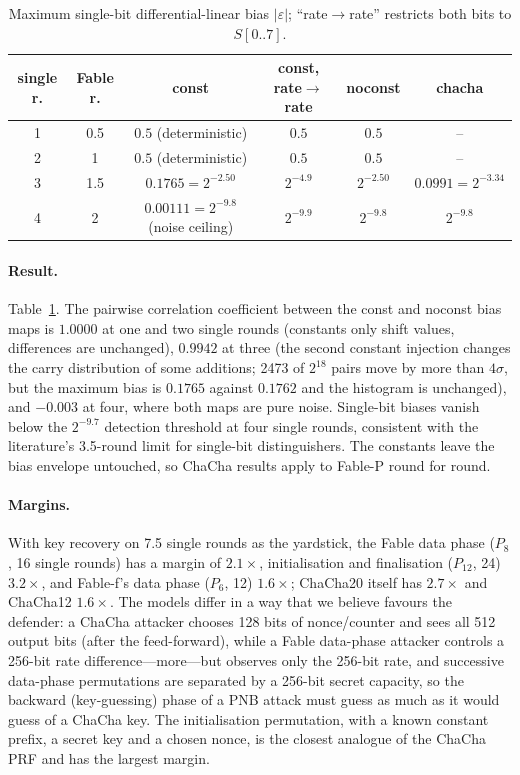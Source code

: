 \documentclass{iacrtrans}
\newcommand{\Fable}{\textsf{Fable}\xspace}
\newcommand{\FableP}{\textsf{Fable-P}\xspace}
\newcommand{\FableF}{\textsf{Fable-f}\xspace}
\newcommand{\ChaCha}{\textsf{ChaCha}\xspace}
\newcommand{\PP}[1]{P_{#1}}
\begin{document}
\begin{table}[htb]
\centering
\caption{Maximum single-bit differential-linear bias $|\varepsilon|$; ``rate$\to$rate'' restricts both bits to $S[0..7]$.}
\label{tab:dlbias}
\footnotesize
\begin{tabular}{cccccc}
\toprule
single r. & \Fable r. & \textsf{const} & \textsf{const}, rate$\to$rate & \textsf{noconst} & \textsf{chacha}\\
\midrule
1 & 0.5 & $0.5$ (deterministic) & $0.5$ & $0.5$ & --\\
2 & 1 & $0.5$ (deterministic) & $0.5$ & $0.5$ & --\\
3 & 1.5 & $0.1765 = 2^{-2.50}$ & $2^{-4.9}$ & $2^{-2.50}$ & $0.0991 = 2^{-3.34}$\\
4 & 2 & $0.00111 = 2^{-9.8}$ (noise ceiling) & $2^{-9.9}$ & $2^{-9.8}$ & $2^{-9.8}$\\
\bottomrule
\end{tabular}
\end{table}

\paragraph{Result.} Table~\ref{tab:dlbias}. The pairwise correlation coefficient between the \textsf{const} and \textsf{noconst} bias maps is $1.0000$ at one and two single rounds (constants only shift values, differences are unchanged), $0.9942$ at three (the second constant injection changes the carry distribution of some additions; 2473 of $2^{18}$ pairs move by more than $4\sigma$, but the maximum bias is $0.1765$ against $0.1762$ and the histogram is unchanged), and $-0.003$ at four, where both maps are pure noise. Single-bit biases vanish below the $2^{-9.7}$ detection threshold at four single rounds, consistent with the literature's 3.5-round limit for single-bit distinguishers. The constants leave the bias envelope untouched, so \ChaCha results apply to \FableP round for round.

\paragraph{Margins.} With key recovery on 7.5 single rounds as the yardstick, the \Fable data phase ($\PP{8}$, 16 single rounds) has a margin of $2.1\times$, initialisation and finalisation ($\PP{12}$, 24) $3.2\times$, and \FableF's data phase ($\PP{6}$, 12) $1.6\times$; ChaCha20 itself has $2.7\times$ and ChaCha12 $1.6\times$. The models differ in a way that we believe favours the defender: a \ChaCha attacker chooses 128 bits of nonce/counter and sees all 512 output bits (after the feed-forward), while a \Fable data-phase attacker controls a 256-bit rate difference---more---but observes only the 256-bit rate, and successive data-phase permutations are separated by a 256-bit secret capacity, so the backward (key-guessing) phase of a PNB attack must guess as much as it would guess of a \ChaCha key. The initialisation permutation, with a known constant prefix, a secret key and a chosen nonce, is the closest analogue of the \ChaCha PRF and has the largest margin.
\end{document}
